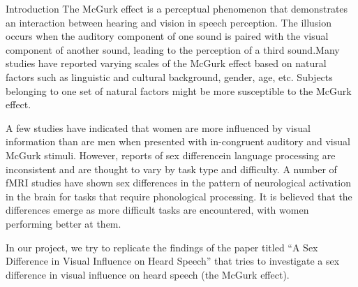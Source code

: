 \documentclass{article}
\begin{document}

\begin{psection}{Introduction}
	The McGurk effect is a perceptual phenomenon that demonstrates an interaction between hearing and vision in speech perception. The illusion occurs when the auditory component of one sound is paired with the visual component of another sound, leading to the perception of a third sound.Many studies have reported varying scales of the McGurk effect based on natural factors such as linguistic and cultural background, gender, age, etc. Subjects belonging to one set of natural factors might be more susceptible to the McGurk effect.

	A few studies have indicated that women are more influenced by visual information than are men when presented with in-congruent auditory and visual McGurk stimuli. However, reports of sex differencein language processing are inconsistent and are thought to vary by task type and difficulty. A number of fMRI studies have shown sex differences in the pattern of neurological activation in the brain for tasks that require phonological processing. It is believed that the differences emerge as more difficult tasks are encountered, with women performing better at them.

	In our project, we try to replicate the findings of the paper titled ``A Sex Difference in Visual Influence on Heard Speech'' that tries to investigate a sex difference in visual influence on heard speech (the McGurk effect).
\end{psection}


\end{document}
